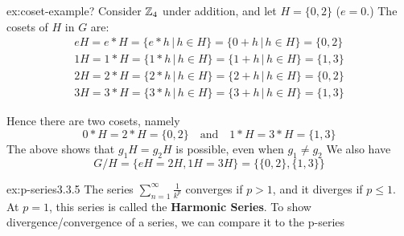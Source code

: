 \documentclass[landscape, 8pt]{extarticle}
\begin{document}
\begin{multicols}{3}
\begin{xmp}{ex:coset-example}{?}
    Consider $\mathbb{Z}_{4}$ under addition, and let $H=\{0,2\}$ ($e=0$.) The cosets of $H$ in $G$ are:
    \[\begin{aligned}
    eH = e * H = \{e * h\,|\,h\in H\} = \{0+h\,|\, h\in H\} = \{0,2\} \\
    1H = 1 * H = \{1 * h\,|\,h\in H\} = \{1+h\,|\, h\in H\} = \{1,3\} \\
    2H = 2 * H = \{2 * h\,|\,h\in H\} = \{2+h\,|\, h\in H\} = \{0,2\} \\
    3H = 3 * H = \{3 * h\,|\,h\in H\} = \{3+h\,|\, h\in H\} = \{1,3\}
    \end{aligned}\]

    Hence there are two cosets, namely
    \[0 * H=2 * H=\{0,2\} \quad\text{and}\quad 1 * H=3 * H=\{1,3\}\]
    The above shows that $g_{1}H=g_{2}H$ is possible, even when $g_{1}\ne g_{2}$
    We also have
    \[G/H=\{eH=2H,1H=3H\} = \{\{0,2\}, \{1,3\}\}\]
\end{xmp}
\vspace{-5pt}

\begin{xmp}[p-series]{ex:p-series}{3.3.5}
The series $\displaystyle\sum_{n=1}^{\infty} \frac{1}{k^{p}}$ converges if $p > 1$, and it diverges if $p \le 1$. At $p = 1$, this series is called the \textbf{Harmonic Series}.
\vspace{0pt}\newline
To show divergence/convergence of a series, we can compare it to the p-series

\end{xmp}
\vspace{-5pt}



\end{multicols}
\end{document}
